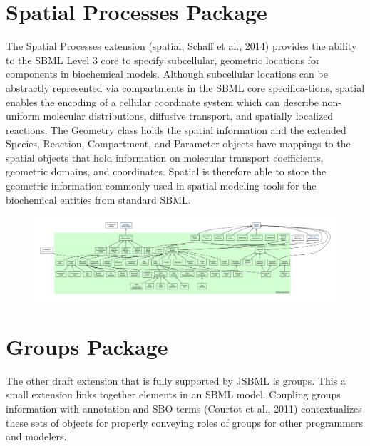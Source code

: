 \section{Spatial Processes Package}
\label{sec:comp-overview}
The Spatial Processes extension (spatial, Schaff et al., 2014)
provides the ability to the SBML Level 3 core to specify subcellular,
geometric locations for components in biochemical
models. Although subcellular locations can be abstractly represented via
compartments in the SBML core specifica-tions, spatial enables the encoding of
a cellular coordinate system which can describe non-uniform molecular distributions,
diffusive transport, and spatially localized reactions. The Geometry class holds
the spatial information and the extended Species, Reaction, Compartment, and
Parameter objects have mappings to the spatial objects that hold information on
molecular transport coefficients, geometric domains, and coordinates. Spatial is
therefore able to store the geometric information commonly used in spatial modeling
tools for the biochemical entities from standard SBML.

\begin{figure}[hb]
 \centering
 \vspace*{2ex}
 \includegraphics[width=\textwidth]{../../../extensions/spatial/doc/img/type_hierarchy.pdf}
 \caption[The spatial processes extension]{}
 \label{fig:spatial}
\end{figure}


\section{Groups Package}
\label{sec:groups-overview}
The other draft extension that is fully supported by JSBML is groups. 
This a small extension links together elements in an SBML model. Coupling
groups information with annotation and SBO terms (Courtot et al., 2011) 
contextualizes these sets of objects for properly conveying roles of groups 
for other programmers and modelers.

